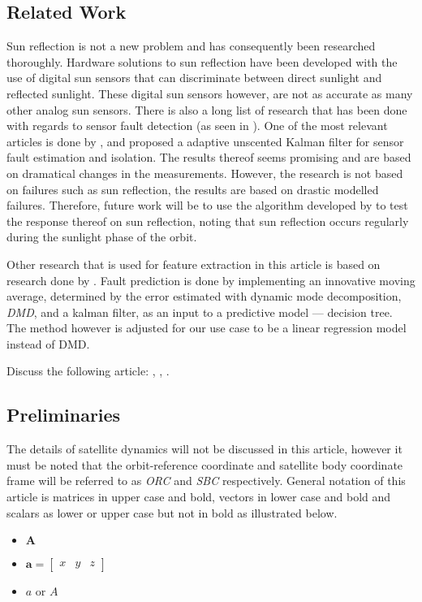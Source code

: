 \documentclass[letterpaper, 10 pt, conference]{ieeeconf}  %
\begin{document}
\subsection{Related Work}
Sun reflection is not a new problem and has consequently been researched thoroughly. Hardware solutions to sun reflection have been developed with the use of digital sun sensors that can discriminate between direct sunlight and reflected sunlight. These digital sun sensors however, are not as accurate as many other analog sun sensors. There is also a long list of research that has been done with regards to sensor fault detection (as seen in \cite{wang2019adaptive}). One of the most relevant articles is done by \textcite{wang2019adaptive}, and proposed a adaptive unscented Kalman filter for sensor fault estimation and isolation. The results thereof seems promising and are based on dramatical changes in the measurements. However, the research is not based on failures such as sun reflection, the results are based on drastic modelled failures. Therefore, future work will be to use the algorithm developed by \textcite{wang2019adaptive} to test the response thereof on sun reflection, noting that sun reflection occurs regularly during the sunlight phase of the orbit.

Other research that is used for feature extraction in this article is based on research done by \textcite{DeSilva2020}. Fault prediction is done by implementing an innovative moving average, determined by the error estimated with dynamic mode decomposition, \emph{DMD}, and a kalman filter, as an input to a predictive model --- decision tree. The method however is adjusted for our use case to be a linear regression model instead of DMD.

Discuss the following article: \cite{Nasrolahi2018}, \cite{Zhou2016}, \cite{Xiong2007}.

\subsection{Preliminaries}
The details of satellite dynamics will not be discussed in this article, however it must be noted that the orbit-reference coordinate and satellite body coordinate frame will be referred to as \emph{ORC} and \emph{SBC} respectively. General notation of this article is matrices in upper case and bold, vectors in lower case and bold and scalars as lower or upper case but not in bold as illustrated below.
\begin{itemize}
	\item{ $\mathbf{A}$}
	\item{ $\mathbf{a} = \begin{bmatrix} 
			x & y & z
		\end{bmatrix}$}
	\item{ $a$ or $A$}
\end{itemize}
\end{document}
